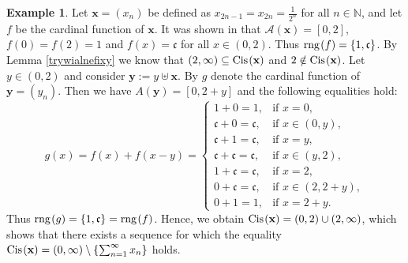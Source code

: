\documentclass{amsart}
\theoremstyle{definition}
\newtheorem{example}[theorem]{Example}
\newcommand{\rng}{{\rm rng} \hspace{0.03cm}}
\newcommand{\Cis}{{\rm Cis} \hspace{0.03cm}}
\begin{document}
\begin{example}\label{ExampleFixMax2}
Let $\mathbf{x}=(x_{n})$ be defined as $x_{2n-1}=x_{2n}=\frac{1}{2^n}$ for all $n\in\mathbb{N}$, and let $f$ be the cardinal function of $\mathbf{x}$. It was shown in \cite{cardfun} that $\mathcal{A}(\mathbf{x})=[0,2]$, $f(0)=f(2)=1$ and $f(x)=\mathfrak{c}$ for all $x\in (0,2)$. Thus $\rng(f)=\{1,\mathfrak{c}\}$. By Lemma \ref{trywialnefixy} we know that $(2,\infty)\subseteq \Cis (\textbf{x})$ and $2\notin \Cis (\textbf{x})$. Let $y\in (0,2)$ and consider $\mathbf{y}:= y\uplus\mathbf{x}$. By $g$ denote the cardinal function of $\mathbf{y}=(y_n)$. Then we have $A(\mathbf{y})=[0,2+y]$ and the following equalities hold:
\begin{displaymath}
g(x) = f(x)+f(x-y)= \left\{ \begin{array}{ll} 
1+0=1, & \textrm{if $x=0$},\\ 
\mathfrak{c}+0=\mathfrak{c}, & \textrm{if $x\in(0,y)$}, \\  
\mathfrak{c}+1= \mathfrak{c}, & \textrm{if $x=y$},\\  
\mathfrak{c} +\mathfrak{c}= \mathfrak{c}, & \textrm{if $x\in (y,2)$},\\ 
1+ \mathfrak{c}= \mathfrak{c}, & \textrm{if $x=2$},\\ 
0+ \mathfrak{c}= \mathfrak{c}, & \textrm{if $x\in (2,2+y)$},\\ 
0+1=1, & \textrm{if $x=2+y$}.
\end{array} \right.
\end{displaymath}
Thus $\rng(g)=\{1,\mathfrak{c}\}=\rng(f)$. Hence, we obtain $\Cis (\textbf{x})=(0,2)\cup(2,\infty)$, which shows that there exists a sequence for which the equality $\Cis (\textbf{x})=(0,\infty)\setminus \{\sum_{n=1}^{\infty}x_n\}$  holds.
\end{example}
\end{document}
